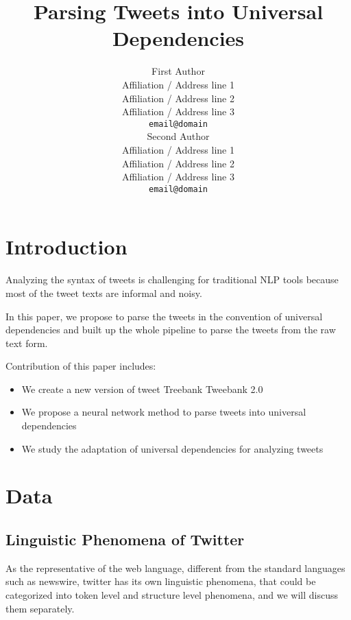 \documentclass[11pt,letterpaper]{article}
\title{Parsing Tweets into Universal Dependencies}
\author{First Author \\
  Affiliation / Address line 1 \\
  Affiliation / Address line 2 \\
  Affiliation / Address line 3 \\
  {\tt email@domain} \\\And
  Second Author \\
  Affiliation / Address line 1 \\
  Affiliation / Address line 2 \\
  Affiliation / Address line 3 \\
  {\tt email@domain} \\}
\date{}
\begin{document}
\maketitle
\begin{abstract}

\end{abstract}




\section{Introduction}
Analyzing the syntax of tweets is challenging for traditional NLP tools because most of the tweet texts are informal and noisy.

In this paper, we propose to parse the tweets in the convention of universal dependencies and built up the whole pipeline to parse the tweets from the raw text form.

Contribution of this paper includes:
\begin{itemize}
\item We create a new version of tweet Treebank Tweebank 2.0
\item We propose a neural network method to parse tweets into universal dependencies
\item We study the adaptation of universal dependencies for analyzing tweets
\end{itemize}



\section{Data}

\subsection{Linguistic Phenomena of Twitter} \label{introduction}
As the representative of the web language, different from the standard languages such as newswire, twitter has its own linguistic phenomena, that could be categorized into token level and structure level phenomena, and we will discuss them separately.
\end{document}
